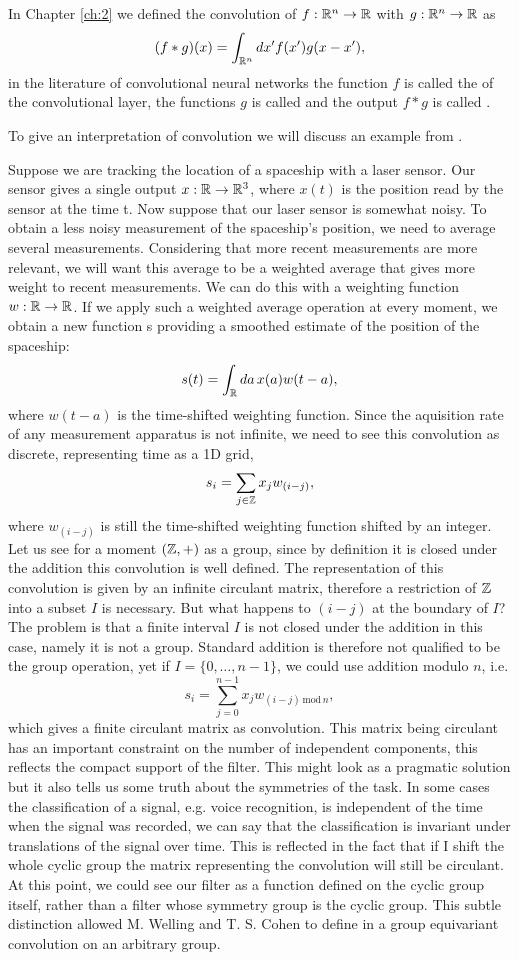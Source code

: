 \documentclass[../3.tex]{subfiles}
\begin{document}
    In Chapter \ref{ch:2} we defined the convolution of $f:\mathbb{R}^n \to \mathbb{R}$ with $g:\mathbb{R}^n \to \mathbb{R}$ as
    \[ (f * g)(x) = \int_{\mathbb{R}^n} dx' f(x')g(x-x'), \]
    in the literature of convolutional neural networks the function $f$ is called the  of the
    convolutional layer, the functions $g$ is called  and the output $f*g$ is called .

    To give an interpretation of convolution we will discuss an example from \cite{deep}.

    Suppose we are tracking the location of a spaceship with a laser sensor. Our
    sensor gives a single output $x : \mathbb{R} \to \mathbb{R}^3$, where $x(t)$ is the position read by the sensor at the time t.
    Now suppose that our laser sensor is somewhat noisy. To obtain a less noisy
    measurement of the spaceship’s position, we need to average several measurements.
    Considering that more recent measurements are more relevant, we will want this average to
    be a weighted average that gives more weight to recent measurements. 
    We can do this with a weighting function $w:\mathbb{R} \to \mathbb{R}$. If
    we apply such a weighted average operation at every moment, we obtain a new
    function s providing a smoothed estimate of the position of the spaceship:
    \[ s(t) = \int_{\mathbb{R}} da \, x(a)w(t-a), \]
    where $w(t-a)$ is the time-shifted weighting function.
    Since the aquisition rate of any measurement apparatus is not infinite, we need to see this convolution as discrete, representing time as a 1D grid,
    \[ s_i = \sum_{j \in \mathbb{Z}} x_j w_{(i-j)}, \]
    where $w_{(i-j)}$ is still the time-shifted weighting function shifted by an integer.
    Let us see for a moment $(\mathbb{Z},+)$ as a group, since by definition it is closed under the addition this convolution is well defined.
    The representation of this convolution is given by an infinite circulant matrix, therefore a restriction of $\mathbb{Z}$
    into a subset $I$ is necessary. But what happens to $(i-j)$ at the boundary of $I$?\\
    The problem is that a finite interval $I$ is not closed under the addition in this case, namely it is not a group.
    Standard addition is therefore not qualified to be the group operation, yet if $I = \{ 0,\dots,n-1 \}$, we could use
    addition modulo $n$, i.e. 
    \[ s_i = \sum_{j = 0}^{n-1} x_j w_{(i-j) \, \text{mod} \, n},\]
    which gives a finite circulant matrix as convolution.
    This matrix being circulant has an important constraint on the number of independent components, this reflects the compact support of the filter.
    This might look as a pragmatic solution but it also tells us some truth about the symmetries of the task.
    In some cases the classification of a signal, e.g. voice recognition, is independent of the time when the signal was recorded,
    we can say that the classification is invariant under translations of the signal over time. This is reflected in the fact that if I 
    shift the whole cyclic group the matrix representing the convolution will still be circulant.
    At this point, we could see our filter as a function defined on the cyclic group itself, rather than a filter whose symmetry group is the cyclic group.
    This subtle distinction allowed M. Welling and T. S. Cohen to define in \cite{gcnn} a group equivariant convolution on an arbitrary group.
    
\end{document}
